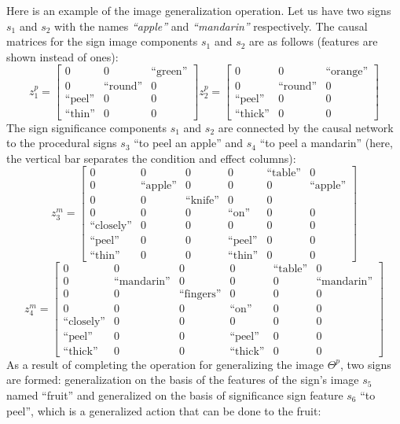 \documentclass[review]{elsarticle}
\begin{document}
Here is an example of the image generalization operation. Let us have two signs $s_1$ and $s_2$ with the names \textit{``apple''} and \textit{``mandarin''} respectively. The causal matrices for the sign image components $s_1$ and $s_2$ are as follows (features are shown instead of ones):
\[
z_1^p = \begin{bmatrix}
0&0& \text{``green''} \\
0& \text{``round''} &0 \\
\text{``peel''} &0 &0  \\
\text{``thin''} &0 &0
\end{bmatrix}
z_2^p = \begin{bmatrix}
0&0& \text{``orange''} \\
0& \text{``round''} &0 \\
\text{``peel''} &0 &0  \\
\text{``thick''} &0 &0
\end{bmatrix}
\]
The sign significance components $s_1$ and $s_2$ are connected by the causal network to the procedural signs $s_3$ ``to peel an apple'' and $s_4$ ``to peel a mandarin'' (here, the vertical bar separates the condition and effect columns):
\[
z_3^m= \left[\begin{array}{ccc|cccc}
0&0&0&0&\text{``table''}&0\\
0&\text{``apple''}&0& 0&0&\text{``apple''}\\
0&0& \text{``knife''} &0 &0\\
0& 0& 0 &\text{``on''} &0&0\\
\text{``closely''}& 0& 0 &0 &0&0\\
\text{``peel''} &0 &0 &\text{``peel''}  &0&0\\
\text{``thin''} &0 &0 & \text{``thin''} &0&0
\end{array}
\right]
\]
\[
z_4^m= \left[\begin{array}{ccc|cccc}
0&0&0&0&\text{``table''}&0\\
0&\text{``mandarin''}&0& 0&0&\text{``mandarin''}\\
0&0& \text{``fingers''} &0 &0&0\\
0& 0& 0 &\text{``on''} &0&0\\
\text{``closely''}& 0& 0 &0 &0&0\\
\text{``peel''} &0 &0 &\text{``peel''}  &0&0\\
\text{``thick''} &0 &0 & \text{``thick''} &0&0
\end{array}
\right]
\] 
As a result of completing the  operation for generalizing the image $\Theta^p$, two signs are formed: generalization on the basis of the features of the sign's image $s_5$ named ``fruit'' and generalized on the basis of significance sign feature $s_6$ ``to peel'', which is a generalized action that can be done to the fruit:
\end{document}
